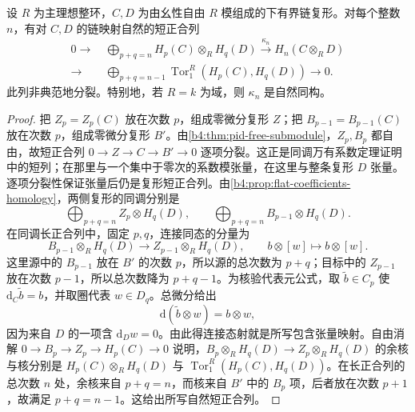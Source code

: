 \begin{theorem}[Künneth 公式]\label{b4:thm:kunneth-pid}
	设 \(R\) 为主理想整环，\(C,D\) 为由幺性自由 \(R\) 模组成的下有界链复形。对每个整数 \(n\)，有对 \(C,D\) 的链映射自然的短正合列
	\[
		\begin{split}
			0\longrightarrow&\ \bigoplus_{p+q=n}H_p(C)\otimes_R H_q(D) \xrightarrow{\kappa_n}H_n(C\otimes_R D)\\
			\longrightarrow&\ \bigoplus_{p+q=n-1}\operatorname{Tor}_1^R(H_p(C),H_q(D)) \longrightarrow0.
		\end{split}
	\]
	此列非典范地分裂。特别地，若 \(R=k\) 为域，则 \(\kappa_n\) 是自然同构。
\end{theorem}
\begin{proof}
	把 \(Z_p=Z_p(C)\) 放在次数 \(p\)，组成零微分复形 \(Z\)；把 \(B_{p-1}=B_{p-1}(C)\) 放在次数 \(p\)，组成零微分复形 \(B'\)。由\cref{b4:thm:pid-free-submodule}，\(Z_p,B_p\) 都自由，故短正合列 \(0\to Z\to C\to B'\to0\) 逐项分裂。这正是同调万有系数定理证明中的短列；在那里与一个集中于零次的系数模张量，在这里与整条复形 \(D\) 张量。逐项分裂性保证张量后仍是复形短正合列。由\cref{b4:prop:flat-coefficients-homology}，两侧复形的同调分别是
	\[
		\bigoplus_{p+q=n}Z_p\otimes H_q(D),\qquad \bigoplus_{p+q=n}B_{p-1}\otimes H_q(D).
	\]
	在同调长正合列中，固定 \(p,q\)，连接同态的分量为
	\[
		B_{p-1}\otimes_RH_q(D)\longrightarrow Z_{p-1}\otimes_RH_q(D), \qquad b\otimes[w]\longmapsto b\otimes[w].
	\]
	这里源中的 \(B_{p-1}\) 放在 \(B'\) 的次数 \(p\)，所以源的总次数为 \(p+q\)；目标中的 \(Z_{p-1}\) 放在次数 \(p-1\)，所以总次数降为 \(p+q-1\)。为核验代表元公式，取 \(\widetilde b\in C_p\) 使 \(\mathrm{d}_C\widetilde b=b\)，并取圈代表 \(w\in D_q\)。总微分给出
	\[
		\mathrm{d}(\widetilde b\otimes w)=b\otimes w,
	\]
	因为来自 \(D\) 的一项含 \(\mathrm{d}_Dw=0\)。由此得连接态射就是所写包含张量映射。自由消解 \(0\to B_p\to Z_p\to H_p(C)\to0\) 说明，\(B_p\otimes_RH_q(D)\to Z_p\otimes_RH_q(D)\) 的余核与核分别是 \(H_p(C)\otimes_RH_q(D)\) 与 \(\operatorname{Tor}_1^R(H_p(C),H_q(D))\)。在长正合列的总次数 \(n\) 处，余核来自 \(p+q=n\)，而核来自 \(B'\) 中的 \(B_p\) 项，后者放在次数 \(p+1\)，故满足 \(p+q=n-1\)。这给出所写自然短正合列。


\end{proof}
